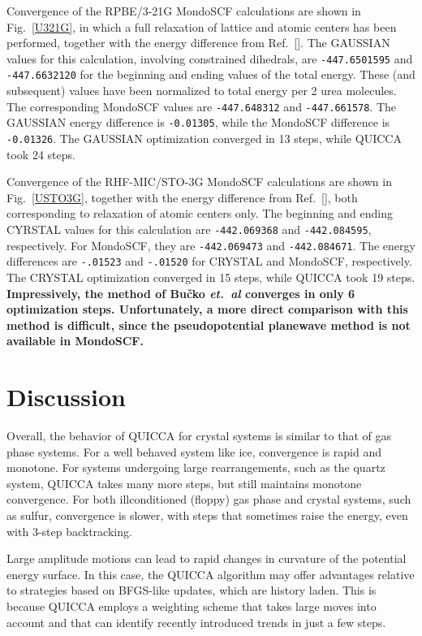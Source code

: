 \twolinestyle{\documentclass[prb,preprint]{revtex4}}
\begin{document}
Convergence of the RPBE/3-21G {\sc MondoSCF} calculations are shown in Fig.~\ref{U321G}, 
in which a full relaxation of lattice and atomic centers has been performed, together
with the energy difference from Ref.~[]. The {\sc GAUSSIAN} values for this 
calculation, involving constrained dihedrals, are {\tt -447.6501595} and {\tt -447.6632120} for the 
beginning and ending values of the total energy.  These (and subsequent) values have been normalized to 
total energy per 2 urea molecules.  The corresponding {\sc MondoSCF} values are {\tt -447.648312} 
and {\tt -447.661578}. The {\sc GAUSSIAN} energy difference is {\tt -0.01305}, while 
the {\sc MondoSCF} difference is {\tt -0.01326}.   The {\sc GAUSSIAN} optimization converged 
in 13 steps, while QUICCA took 24 steps.

Convergence of the RHF-MIC/STO-3G {\sc MondoSCF} calculations are shown in Fig.~\ref{USTO3G}, together
with the energy difference from Ref.~[], both corresponding to 
relaxation of atomic centers only.   The beginning and ending {\sc CYRSTAL} values for this 
calculation are {\tt -442.069368} and {\tt -442.084595}, respectively.  For {\sc MondoSCF},
they are {\tt -442.069473} and {\tt -442.084671}.  The energy differences are {\tt -.01523} and
{\tt -.01520} for {\sc CRYSTAL} and {\sc MondoSCF}, respectively.  The {\sc CRYSTAL} optimization
converged in 15 steps, while QUICCA took 19 steps.  {\bf Impressively, the method of Bu\v{c}ko {\em et.~al} 
converges in only 6 optimization steps.  Unfortunately, a more direct comparison with this 
method is difficult, since the pseudopotential planewave method is not available in {\sc MondoSCF}. 
}

\section{Discussion}\label{discussion}

Overall,  the behavior of QUICCA for crystal systems is similar to that of gas phase systems. 
For a well behaved system like ice, convergence is rapid and monotone. 
For systems undergoing large rearrangements, such as the quartz system, QUICCA
takes many more steps, but still maintains monotone convergence.
For both illconditioned (floppy)  gas phase and crystal systems, such as 
sulfur, convergence is slower, with steps that sometimes raise the energy, 
even with 3-step backtracking.

Large amplitude motions can lead to rapid changes in curvature of the 
potential energy surface.  In this case, the QUICCA algorithm may offer
advantages relative to strategies based on BFGS-like updates, which are 
history laden.   This is because QUICCA employs a weighting scheme that 
takes large moves into account and that can identify recently introduced
trends in just a few steps.
\end{document}
